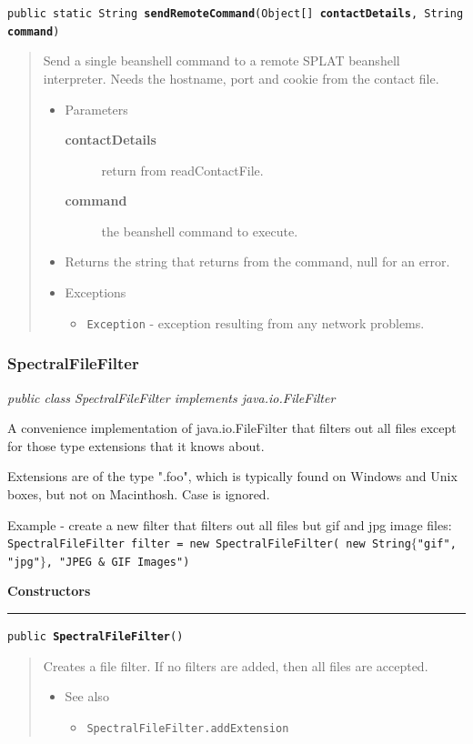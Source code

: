 \documentclass[twoside,11pt]{article}
\renewcommand{\_}{\texttt{\symbol{95}}}
\newcommand{\refdefined}[1]{}
\newcommand{\startsection}[4]{
   \subsubsection{\label{#3}{#2}}
   #4
}
\newcommand{\method}[1]{\texttt{#1}}
\newenvironment{desc}{\begin{quote}}{\end{quote}}
\newcommand{\constructors}{
   \par\textbf{\large{Constructors}}\\
   \hrule
}
\begin{document}
\method{public static String \textbf{sendRemoteCommand}(\texttt{Object[]} \textbf{contactDetails}, \texttt{String} \textbf{command})\label{l242}\label{l243}}
\begin{desc}Send a single beanshell command to a remote SPLAT beanshell
 interpreter. Needs the hostname, port and cookie from the
 contact file.
\begin{itemize}
\item{Parameters
  \begin{description}
   \item[\textbf{contactDetails}]{return from readContactFile.}
   \item[\textbf{command}]{the beanshell command to execute.}
  \end{description}}
\end{itemize}
\begin{itemize}
\item{Returns the string that returns from the command, null for an error. }
\item{{Exceptions}
  \begin{itemize}
   \item{\vspace{-.6ex}\texttt{Exception} - exception resulting from any network problems.}
  \end{itemize}
}
\end{itemize}
\end{desc}

\startsection{Class}{SpectralFileFilter}{l237}

\fbox{\parbox{\textwidth}{
\textit{public
 class SpectralFileFilter implements java.io.FileFilter}
}} %





{A convenience implementation of java.io.FileFilter that filters out
 all files except for those type extensions that it knows about.

 Extensions are of the type ".foo", which is typically found on
 Windows and Unix boxes, but not on Macinthosh. Case is ignored.

 Example - create a new filter that filters out all files
 but gif and jpg image files:
 \texttt{
\mbox{}\newline
    SpectralFileFilter filter = new SpectralFileFilter(\mbox{}\newline
                   new String$\{$"gif", "jpg"$\}$, "JPEG \& GIF Images")\mbox{}\newline
 }
}
\constructors
\method{public \textbf{SpectralFileFilter}()\label{l244}\label{l245}}
\begin{desc}Creates a file filter. If no filters are added, then all
 files are accepted.
\begin{itemize}
\item{{See also}
  \begin{itemize}
   \item{\texttt{SpectralFileFilter.addExtension} {
\refdefined{l246}}
}
  \end{itemize}
}
\end{itemize}
\end{desc}
\end{document}
